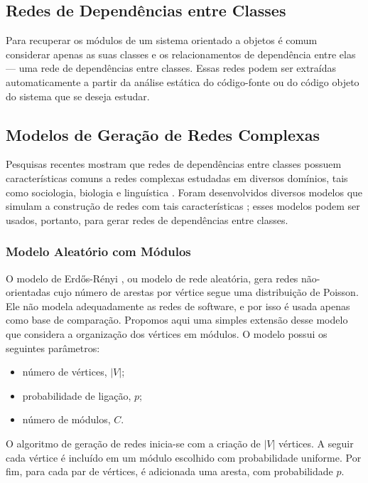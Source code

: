\documentclass{acm_proc_article-sp}
\begin{document}
\subsection{Redes de Dependências entre Classes}

Para recuperar os módulos de um sistema orientado a objetos é comum considerar apenas as suas classes e os relacionamentos de dependência entre elas --- uma rede de dependências entre classes. Essas redes podem ser extraídas automaticamente a partir da análise estática do código-fonte ou do código objeto do sistema que se deseja estudar.

\subsection{Modelos de Geração de Redes Complexas}

Pesquisas recentes mostram que redes de dependências entre classes possuem características comuns a redes complexas estudadas em diversos domínios, tais como sociologia, biologia e linguística \cite{Myers2003,Valverde2003}. Foram desenvolvidos diversos modelos que simulam a construção de redes com tais características \cite{Bollobas2003,Lancichinetti2008}; esses modelos podem ser usados, portanto, para gerar redes de dependências entre classes. 

\subsubsection{Modelo Aleatório com Módulos}

O modelo de Erdős-Rényi \cite{Erdos1959}, ou modelo de rede aleatória, gera redes não-orientadas cujo número de arestas por vértice segue uma distribuição de Poisson. Ele não modela adequadamente as redes de software, e por isso é usada apenas como base de comparação. Propomos aqui uma simples extensão desse modelo que considera a organização dos vértices em módulos. O modelo possui os seguintes parâmetros:

\begin{itemize}
  \item número de vértices, $|V|$;
  \item probabilidade de ligação, $p$;
  \item número de módulos, $C$.
\end{itemize} 

O algoritmo de geração de redes inicia-se com a criação de $|V|$ vértices. A seguir cada vértice é incluído em um módulo escolhido com probabilidade uniforme. Por fim, para cada par de vértices, é adicionada uma aresta, com probabilidade $p$.
\end{document}
